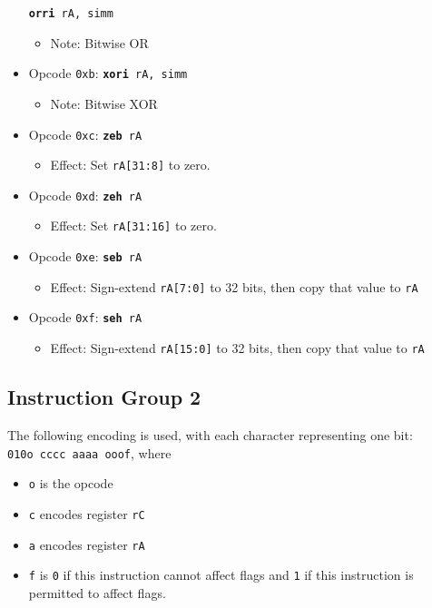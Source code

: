 \documentclass{article}
\begin{document}
\begin{itemize}
			\texttt{\textbf{orri} rA, simm}
		\begin{itemize}
			\item Note:  Bitwise OR
		\end{itemize}
		\item Opcode \texttt{0xb}:
			\texttt{\textbf{xori} rA, simm}
		\begin{itemize}
			\item Note:  Bitwise XOR
		\end{itemize}
		\item Opcode \texttt{0xc}:
			\texttt{\textbf{zeb} rA}
		\begin{itemize}
			\item Effect:  Set \texttt{rA[31:8]} to zero.
		\end{itemize}
		\item Opcode \texttt{0xd}:
			\texttt{\textbf{zeh} rA}
		\begin{itemize}
			\item Effect:  Set \texttt{rA[31:16]} to zero.
		\end{itemize}
		\item Opcode \texttt{0xe}:
			\texttt{\textbf{seb} rA}
		\begin{itemize}
			\item Effect:
				Sign-extend \texttt{rA[7:0]} to 32 bits, then copy that
				value to \texttt{rA}
		\end{itemize}
		\item Opcode \texttt{0xf}:
			\texttt{\textbf{seh} rA}
		\begin{itemize}
			\item Effect:
				Sign-extend \texttt{rA[15:0]} to 32 bits, then copy that
				value to \texttt{rA}
		\end{itemize}
	\end{itemize}

	\doublespacing

	\subsection{Instruction Group 2}
	The following encoding is used, with each character representing one
	bit:  \\
	\texttt{010o cccc aaaa ooof}, where

	\singlespacing
	\begin{itemize}
		\item \texttt{o} is the opcode
		\item \texttt{c} encodes register \texttt{rC}
		\item \texttt{a} encodes register \texttt{rA}
		\item \texttt{f} is \texttt{0} if this instruction cannot affect
		flags and \texttt{1} if this instruction is permitted to affect
		flags. 
	\end{itemize}
	\doublespacing
\end{document}
